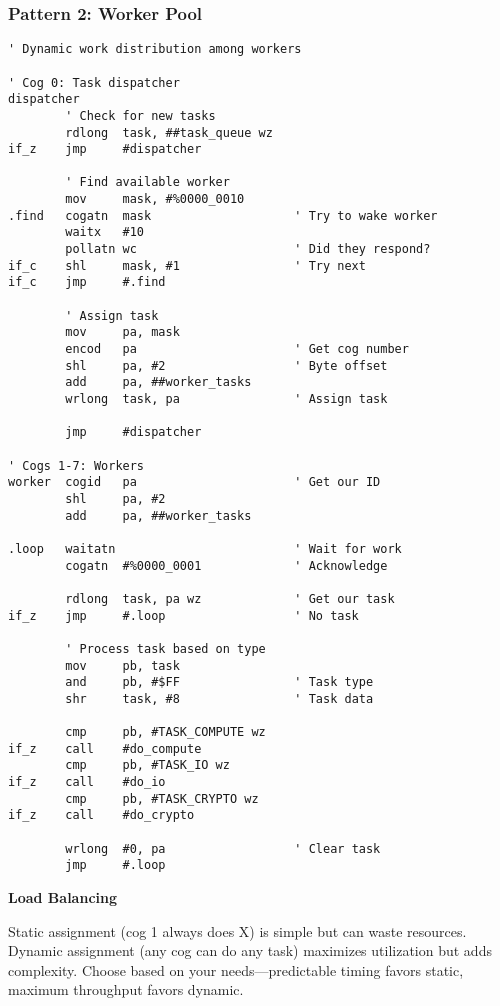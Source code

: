 \documentclass[11pt]{book}
\begin{document}
\hypertarget{pattern-2-worker-pool}{%
\subsubsection{Pattern 2: Worker Pool}\label{pattern-2-worker-pool}}

\begin{lstlisting}
' Dynamic work distribution among workers

' Cog 0: Task dispatcher
dispatcher
        ' Check for new tasks
        rdlong  task, ##task_queue wz
if_z    jmp     #dispatcher
        
        ' Find available worker
        mov     mask, #%0000_0010
.find   cogatn  mask                    ' Try to wake worker
        waitx   #10
        pollatn wc                      ' Did they respond?
if_c    shl     mask, #1                ' Try next
if_c    jmp     #.find
        
        ' Assign task
        mov     pa, mask
        encod   pa                      ' Get cog number
        shl     pa, #2                  ' Byte offset
        add     pa, ##worker_tasks
        wrlong  task, pa                ' Assign task
        
        jmp     #dispatcher

' Cogs 1-7: Workers
worker  cogid   pa                      ' Get our ID
        shl     pa, #2
        add     pa, ##worker_tasks
        
.loop   waitatn                         ' Wait for work
        cogatn  #%0000_0001             ' Acknowledge
        
        rdlong  task, pa wz             ' Get our task
if_z    jmp     #.loop                  ' No task
        
        ' Process task based on type
        mov     pb, task
        and     pb, #$FF                ' Task type
        shr     task, #8                ' Task data
        
        cmp     pb, #TASK_COMPUTE wz
if_z    call    #do_compute
        cmp     pb, #TASK_IO wz
if_z    call    #do_io
        cmp     pb, #TASK_CRYPTO wz
if_z    call    #do_crypto
        
        wrlong  #0, pa                  ' Clear task
        jmp     #.loop
\end{lstlisting}

\begin{sidetrack}
\textbf{Load Balancing}

Static assignment (cog 1 always does X) is simple but can waste resources. Dynamic assignment (any cog can do any task) maximizes utilization but adds complexity. Choose based on your needs—predictable timing favors static, maximum throughput favors dynamic.
\end{sidetrack}
\end{document}
